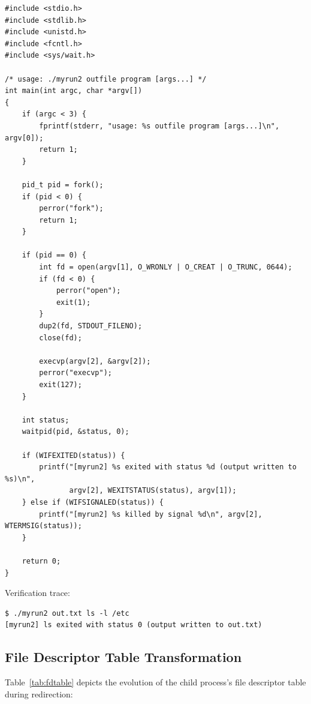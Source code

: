 \documentclass[12pt,a4paper]{article}
\begin{document}
\begin{lstlisting}[style=cstyle]
#include <stdio.h>
#include <stdlib.h>
#include <unistd.h>
#include <fcntl.h>
#include <sys/wait.h>

/* usage: ./myrun2 outfile program [args...] */
int main(int argc, char *argv[])
{
    if (argc < 3) {
        fprintf(stderr, "usage: %s outfile program [args...]\n", argv[0]);
        return 1;
    }

    pid_t pid = fork();
    if (pid < 0) {
        perror("fork");
        return 1;
    }

    if (pid == 0) {
        int fd = open(argv[1], O_WRONLY | O_CREAT | O_TRUNC, 0644);
        if (fd < 0) {
            perror("open");
            exit(1);
        }
        dup2(fd, STDOUT_FILENO);
        close(fd);

        execvp(argv[2], &argv[2]);
        perror("execvp");
        exit(127);
    }

    int status;
    waitpid(pid, &status, 0);

    if (WIFEXITED(status)) {
        printf("[myrun2] %s exited with status %d (output written to %s)\n",
               argv[2], WEXITSTATUS(status), argv[1]);
    } else if (WIFSIGNALED(status)) {
        printf("[myrun2] %s killed by signal %d\n", argv[2], WTERMSIG(status));
    }

    return 0;
}
\end{lstlisting}

Verification trace:
\begin{lstlisting}[style=consolestyle]
$ ./myrun2 out.txt ls -l /etc
[myrun2] ls exited with status 0 (output written to out.txt)
\end{lstlisting}

\subsection{File Descriptor Table Transformation}
Table~\ref{tab:fdtable} depicts the evolution of the child process's file descriptor table during redirection:
\end{document}
